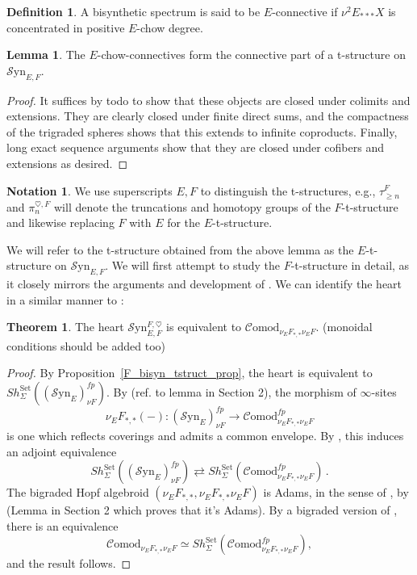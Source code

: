 \documentclass[10pt]{amsart}
\theoremstyle{definition}
\numberwithin{figure}{section}
\numberwithin{equation}{section}
\newtheorem{theorem}[figure]{Theorem}
\newtheorem{lemma}[figure]{Lemma}
\newtheorem{definition}[figure]{Definition}
\newtheorem{notation}[figure]{Notation}
\theoremstyle{cited}
\newcommand{\Syn}{\mathcal{S}\mathrm{yn}}
\newcommand{\Comod}{\mathcal{C}\mathrm{omod}}
\begin{document}
\begin{definition}
  A bisynthetic spectrum is said to be $E$-connective if $\nu^2E_{***}X$ is concentrated in positive $E$-chow degree.
\end{definition}

\begin{lemma}
  The $E$-chow-connectives form the connective part of a t-structure on $\Syn_{E,F}$.
\end{lemma}

\begin{proof}
  It suffices by todo to show that these objects are closed under colimits and extensions. They are clearly closed under finite direct sums, and the compactness of the trigraded spheres shows that this extends to infinite coproducts. Finally, long exact sequence arguments show that they are closed under cofibers and extensions as desired.
\end{proof}

\begin{notation}
  We use superscripts $E,F$ to distinguish the t-structures, e.g., $\tau_{\geq n}^F$ and $\pi_n^{\heartsuit,F}$ will denote the truncations and homotopy groups of the $F$-t-structure and likewise replacing $F$ with $E$ for the $E$-t-structure.
\end{notation}

We will refer to the t-structure obtained from the above lemma as the $E$-t-structure on $\Syn_{E,F}$. We will first attempt to study the $F$-t-structure in detail, as it closely mirrors the arguments and development of \cite{Pst22}. We can identify the heart in a similar manner to \cite{Pst22}:
  
  \begin{theorem}
      The heart $\Syn_{E,F}^{F,\heartsuit}$ is equivalent to $\Comod_{\nu_EF_{*,*}\nu_EF}$. (monoidal conditions should be added too)
  \end{theorem}
  
  \begin{proof}
      By Proposition~\ref{F_bisyn_tstruct_prop}, the heart is equivalent to $Sh_{\Sigma}^{\mathrm{Set}}((\Syn_E)_{\nu F}^{fp})$. By (ref. to lemma in Section 2), the morphism of $\infty$-sites $$\nu_EF_{*,*}(-):(\Syn_E)_{\nu F}^{fp}\to\Comod_{\nu_EF_{*,*}\nu_EF}^{fp}$$ is one which reflects coverings and admits a common envelope. By \cite[Rem. 2.50]{Pst22}, this induces an adjoint equivalence $$Sh_{\Sigma}^{\mathrm{Set}}((\Syn_E)_{\nu F}^{fp})\rightleftarrows Sh_{\Sigma}^{\mathrm{Set}}(\Comod_{\nu_EF_{*,*}\nu_EF}^{fp})\,.$$
  The bigraded Hopf algebroid $(\nu_EF_{*,*},\nu_EF_{*,*}\nu_EF)$ is Adams, in the sense of \cite[Def. 3.1]{Pst22}, by (Lemma in Section 2 which proves that it's Adams). By a bigraded version of \cite[2.1.12]{GH05}, \cite[Thm. 3.2]{Pst22} there is an equivalence
  $$
  \Comod_{\nu_EF_{*,*}\nu_EF}\simeq Sh_{\Sigma}^{\mathrm{Set}}(\Comod_{\nu_EF_{*,*}\nu_EF}^{fp}),
  $$
  and the result follows.
  \end{proof}
  
\end{document}
